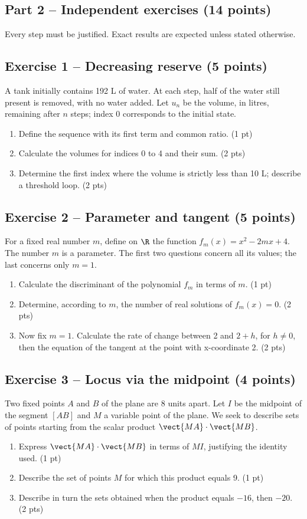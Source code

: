 \clearpage\subsection*{Part 2 -- Independent exercises (14 points)}
Every step must be justified. Exact results are expected unless stated otherwise.
\subsection*{Exercise 1 -- Decreasing reserve (5 points)}
A tank initially contains 192 L of water. At each step, half of the water still present is removed, with no water added. Let $u_n$ be the volume, in litres, remaining after $n$ steps; index 0 corresponds to the initial state.
\begin{enumerate}
\item Define the sequence with its first term and common ratio. \hfill(1 pt)
\item Calculate the volumes for indices 0 to 4 and their sum. \hfill(2 pts)
\item Determine the first index where the volume is strictly less than 10 L; describe a threshold loop. \hfill(2 pts)
\end{enumerate}
\subsection*{Exercise 2 -- Parameter and tangent (5 points)}
For a fixed real number $m$, define on $\R$ the function $f_m(x)=x^2-2mx+4$. The number $m$ is a parameter. The first two questions concern all its values; the last concerns only $m=1$.
\begin{enumerate}
\item Calculate the discriminant of the polynomial $f_m$ in terms of $m$. \hfill(1 pt)
\item Determine, according to $m$, the number of real solutions of $f_m(x)=0$. \hfill(2 pts)
\item Now fix $m=1$. Calculate the rate of change between 2 and $2+h$, for $h\ne0$, then the equation of the tangent at the point with x-coordinate 2. \hfill(2 pts)
\end{enumerate}
\subsection*{Exercise 3 -- Locus via the midpoint (4 points)}
Two fixed points $A$ and $B$ of the plane are 8 units apart. Let $I$ be the midpoint of the segment $[AB]$ and $M$ a variable point of the plane. We seek to describe sets of points starting from the scalar product $\vect{MA}\cdot\vect{MB}$.
\begin{enumerate}
\item Express $\vect{MA}\cdot\vect{MB}$ in terms of $MI$, justifying the identity used. \hfill(1 pt)
\item Describe the set of points $M$ for which this product equals 9. \hfill(1 pt)
\item Describe in turn the sets obtained when the product equals $-16$, then $-20$. \hfill(2 pts)
\end{enumerate}
